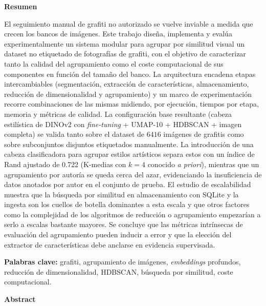 
\newpage
\renewcommand{\thepage}{\roman{page}} 
\setcounter{page}{1} 
\pagestyle{fancy}
\fancyhf{}
\fancyfoot[LE,RO]{\textbf{\thepage}}
\renewcommand{\headrulewidth}{0.0pt}
\renewcommand{\footrulewidth}{0.4pt}
\vspace{6.5cm}
\textbf{Resumen}

El seguimiento manual de grafiti no autorizado se vuelve inviable a medida que
crecen los bancos de imágenes. Este trabajo diseña, implementa y evalúa
experimentalmente un sistema modular para agrupar por similitud visual un
dataset no etiquetado de fotografías de grafiti, con el objetivo de
caracterizar tanto la calidad del agrupamiento como el coste computacional de
sus componentes en función del tamaño del banco. La arquitectura encadena
etapas intercambiables (segmentación, extracción de características,
almacenamiento, reducción de dimensionalidad y agrupamiento) y un marco de
experimentación recorre combinaciones de las mismas midiendo, por ejecución,
tiempos por etapa, memoria y métricas de calidad. La configuración base
resultante (cabeza estilística de DINOv2 con \textit{fine-tuning} + UMAP-10 +
HDBSCAN + imagen completa) se valida tanto sobre el dataset de $6416$ imágenes
de grafitis como sobre subconjuntos disjuntos etiquetados manualmente. La
introducción de una cabeza clasificadora para agrupar estilos artísticos separa
estos con un índice de Rand ajustado de 0.722 (K-medias con $k{=}4$ conocido
\textit{a priori}), mientras que un agrupamiento por autoría se queda cerca del
azar, evidenciando la insuficiencia de datos anotados por autor en el conjunto
de prueba. El estudio de escalabilidad muestra que la búsqueda por similitud en
almacenamiento con SQLite y la ingesta son los cuellos de botella dominantes a
esta escala y que otros factores como la complejidad de los algoritmos de
reducción o agrupamiento empezarían a serlo a escalas bastante mayores. Se
concluye que las métricas intrínsecas de evaluación del agrupamiento pueden
inducir a error y que la elección del extractor de características debe
anclarse en evidencia supervisada.

\textbf{Palabras clave:} grafiti, agrupamiento de imágenes, \textit{embeddings}
profundos, reducción de dimensionalidad, HDBSCAN, búsqueda por similitud, coste
computacional.


\vspace{1cm}
\textbf{Abstract}

